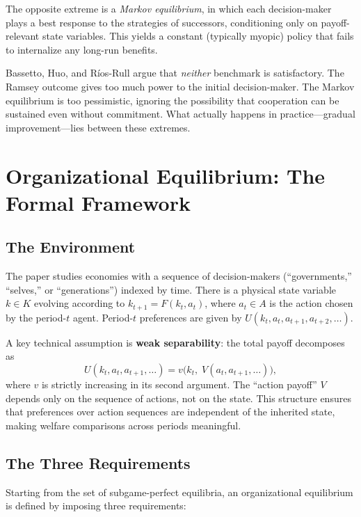 \documentclass[12pt]{article}
\begin{document}
The opposite extreme is a \emph{Markov equilibrium}, in which each
decision-maker plays a best response to the strategies of successors, conditioning
only on payoff-relevant state variables.  This yields a constant (typically
myopic) policy that fails to internalize any long-run benefits.

Bassetto, Huo, and R\'ios-Rull argue that \emph{neither} benchmark is
satisfactory.  The Ramsey outcome gives too much power to the initial
decision-maker.  The Markov equilibrium is too pessimistic, ignoring the
possibility that cooperation can be sustained even without commitment.  What
actually happens in practice---gradual improvement---lies between these
extremes.


\section{Organizational Equilibrium: The Formal Framework}

\subsection{The Environment}

The paper studies economies with a sequence of decision-makers (``governments,''
``selves,'' or ``generations'') indexed by time.  There is a physical state
variable $k \in K$ evolving according to $k_{t+1} = F(k_t, a_t)$, where
$a_t \in A$ is the action chosen by the period-$t$ agent.  Period-$t$
preferences are given by $U(k_t, a_t, a_{t+1}, a_{t+2}, \ldots)$.

A key technical assumption is \textbf{weak separability}: the total payoff
decomposes as
\[
  U(k_t, a_t, a_{t+1}, \ldots) = v\bigl(k_t,\; V(a_t, a_{t+1}, \ldots)\bigr),
\]
where $v$ is strictly increasing in its second argument.  The ``action payoff''
$V$ depends only on the sequence of actions, not on the state.  This structure
ensures that preferences over action sequences are independent of the
inherited state, making welfare comparisons across periods meaningful.

\subsection{The Three Requirements}

Starting from the set of subgame-perfect equilibria, an organizational
equilibrium is defined by imposing three requirements:
\end{document}
